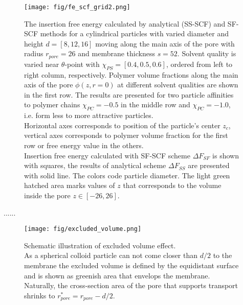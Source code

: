 \documentclass[12pt, a4paper]{article}
\begin{document}


\begin{figure}
    \centering
    \texttt{[image: fig/fe\_scf\_grid2.png]}
    \caption{ 
    The insertion free energy calculated by analytical (SS-SCF) and SF-SCF methods for a cylindrical particles with varied diameter and height $d=[8, 12, 16]$ moving along the main axis of the pore with radius $r_{pore} = 26$ and membrane thickness $s=52$.
    Solvent quality is varied near $\theta$-point with $\chi_{PS} = [0.4, 0.5, 0.6]$, ordered from left to right column, respectively.
    Polymer volume fractions along the main axis of the pore $\phi(z,r=0)$ at different solvent qualities are shown in the first row.
    The results are presented for two particle affinities to polymer chains $\chi_{PC} = -0.5$ in the middle row and $\chi_{PC} = -1.0$, i.e. form less to more attractive particles.
    \\
    Horizontal axes corresponds to position of the particle's center $z_c$, vertical axes corresponds to polymer volume fraction for the first row or free energy value in the others.
    \\
    Insertion free energy calculated with SF-SCF scheme $\Delta F_{SF}$ is shown with squares, the results of analytical scheme $\Delta F_{SS}$ are presented with solid line. 
    The colors code particle diameter.
    The light green hatched area marks values of $z$ that corresponds to the volume inside the pore $z\in [-26, 26]$.
    \label{fig:fe_scf_grid}
    }
\end{figure}

......
\begin{figure}
    \centering
    \texttt{[image: fig/excluded\_volume.png]}
    \caption{
        Schematic illustration of excluded volume effect.
        \\
        As a spherical colloid particle can not come closer than $d/2$ to the membrane the excluded volume is defined by the equidistant surface and is shown as greenish area that envelops the membrane.
        Naturally, the cross-section area of the pore that supports transport shrinks to $r_{pore}^{\ast} = r_{pore} - d/2$.
    }
    \label{fig:excluded_volume}
\end{figure}
\end{document}
